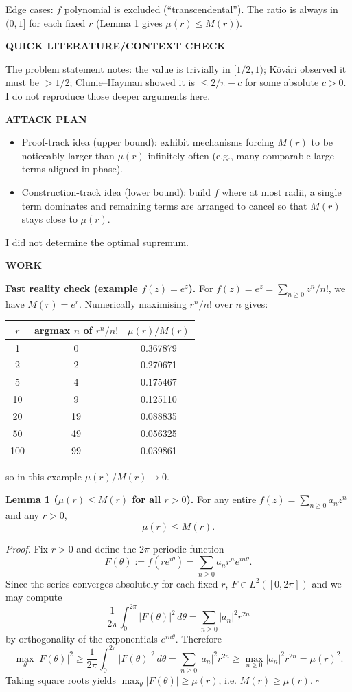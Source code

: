 Edge cases: $f$ polynomial is excluded (``transcendental''). The ratio is always in $(0,1]$ for each fixed $r$ (Lemma 1 gives $\mu(r)\le M(r)$).

\medskip
\noindent\textbf{QUICK LITERATURE/CONTEXT CHECK}

The problem statement notes: the value is trivially in $[1/2,1)$; K\"ov\'ari observed it must be $>1/2$; Clunie--Hayman showed it is $\le 2/\pi-c$ for some absolute $c>0$. I do not reproduce those deeper arguments here.

\medskip
\noindent\textbf{ATTACK PLAN}

\begin{itemize}
\item Proof-track idea (upper bound): exhibit mechanisms forcing $M(r)$ to be noticeably larger than $\mu(r)$ infinitely often (e.g., many comparable large terms aligned in phase).
\item Construction-track idea (lower bound): build $f$ where at most radii, a single term dominates and remaining terms are arranged to cancel so that $M(r)$ stays close to $\mu(r)$.
\end{itemize}
I did not determine the optimal supremum.

\medskip
\noindent\textbf{WORK}

\noindent\textbf{Fast reality check (example $f(z)=e^z$).}
For $f(z)=e^z=\sum_{n\ge 0} z^n/n!$, we have $M(r)=e^r$. Numerically maximising $r^n/n!$ over $n$ gives:

\begin{center}
\begin{tabular}{c|c|c}
$r$ & argmax $n$ of $r^n/n!$ & $\mu(r)/M(r)$\\
\hline
1 & 0 & 0.367879\\
2 & 2 & 0.270671\\
5 & 4 & 0.175467\\
10 & 9 & 0.125110\\
20 & 19 & 0.088835\\
50 & 49 & 0.056325\\
100 & 99 & 0.039861\\
\end{tabular}
\end{center}
so in this example $\mu(r)/M(r)\to 0$.

\medskip
\noindent\textbf{Lemma 1 ($\mu(r)\le M(r)$ for all $r>0$).}
For any entire $f(z)=\sum_{n\ge 0} a_n z^n$ and any $r>0$,
\[
\mu(r)\le M(r).
\]

\textit{Proof.}
Fix $r>0$ and define the $2\pi$-periodic function
\[
F(\theta):=f(re^{i\theta})=\sum_{n\ge 0} a_n r^n e^{in\theta}.
\]
Since the series converges absolutely for each fixed $r$, $F\in L^2([0,2\pi])$ and we may compute
\[
\frac{1}{2\pi}\int_0^{2\pi} |F(\theta)|^2\,d\theta
=\sum_{n\ge 0} |a_n|^2 r^{2n}
\]
by orthogonality of the exponentials $e^{in\theta}$.
Therefore
\[
\max_{\theta} |F(\theta)|^2 \ge \frac{1}{2\pi}\int_0^{2\pi} |F(\theta)|^2\,d\theta
=\sum_{n\ge 0} |a_n|^2 r^{2n} \ge \max_{n\ge 0} |a_n|^2 r^{2n} = \mu(r)^2.
\]
Taking square roots yields $\max_{\theta}|F(\theta)|\ge \mu(r)$, i.e. $M(r)\ge \mu(r)$.
\hfill$\square$

